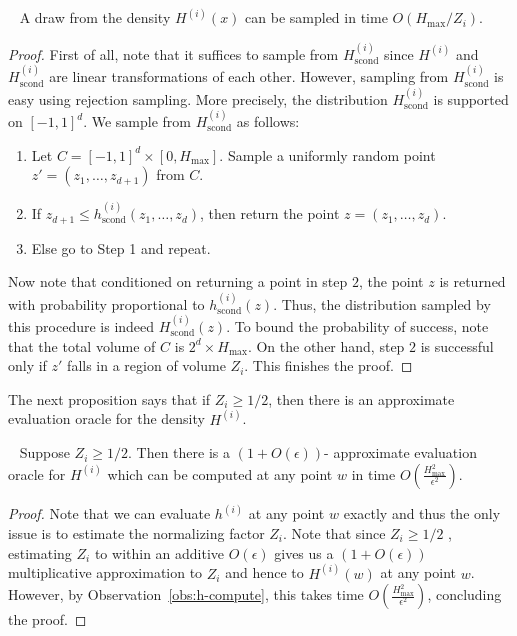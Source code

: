 \begin{proposition}~\label{prop:samplable}
A draw from the density ${H}^{(i)}(x)$ can be sampled in time
$O(H_{\max}/Z_{i})$.
\end{proposition}
\begin{proof}
First of all, note that it suffices to sample from ${H}_{\mathrm{scond}}^{(i)}$ since $H^{(i)}$ and $H^{(i)}_{\mathrm{scond}}$ are linear transformations of each other. However, sampling from ${H}_{\mathrm{scond}}^{(i)}$  is easy using rejection sampling. More precisely, the  distribution ${H}_{\mathrm{scond}}^{(i)}$ is supported on $[-1,1]^d$. We sample from ${H}_{\mathrm{scond}}^{(i)}$ as follows: 
\begin{enumerate}
\item Let $C = [-1,1]^d \times [0, H_{\max}]$. Sample a  uniformly random point $z'= (z_1, \ldots, z_{d+1})$ from $C$. 
\item If $z_{d+1} \le {h}_{\mathrm{scond}}^{(i)}(z_1, \ldots, z_d)$, then return the point $z=(z_1, \ldots, z_d)$. 
\item Else go to Step 1 and repeat. 
\end{enumerate}
Now note that conditioned on returning a point  in step $2$, the point $z$ is returned with probability proportional to ${h}_{\mathrm{scond}}^{(i)}(z)$. Thus, the distribution sampled by this procedure is indeed ${H}_{\mathrm{scond}}^{(i)}(z)$. To bound the probability of success, note that the total volume of $C$ is $2^{d} \times H_{\max}$. On the other hand, step $2$ is successful only if $z'$ falls in a region of volume $Z_{i}$. This finishes the proof.  
\end{proof}
The next proposition says that if $Z_i \ge 1/2$, then there is an approximate evaluation oracle for the density ${H}^{(i)}$. 
\begin{proposition}~\label{prop:density-compute}
Suppose $Z_i \ge 1/2$. Then there is a $(1+O(\epsilon))$- approximate evaluation oracle for ${H}^{(i)}$ which can be computed at any point $w$ in time $O\left( \frac{H_{\max}^2 }{\epsilon^2} \right)$.
\end{proposition}
\begin{proof}
Note that we can evaluate ${h}^{(i)}$ at any point $w$ exactly and thus the only issue is to estimate the normalizing factor $Z_i$. Note that since $Z_i \ge 1/2$ , estimating $Z_i$ to within an additive $O(\epsilon)$ gives us a $(1+O(\epsilon))$ multiplicative approximation to $Z_i$ and hence to ${H}^{(i)}(w)$ at any point $w$. However, by Observation~\ref{obs:h-compute}, this takes time $O \left( \frac{H_{\max}^2 }{\epsilon^2} \right)$, concluding the proof. 
\end{proof}

